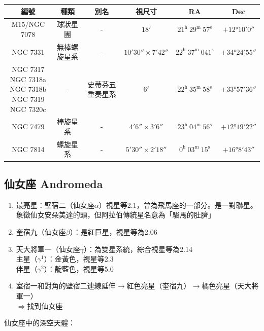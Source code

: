 \begin{center}
\begin{longtable}{c | c | c | c | c | c}
    編號 & 種類 & 別名 & 視尺寸 & RA & Dec \\
    \hline
    \endfirsthead


    \endfoot

    \endlastfoot

    M15/NGC 7078 & 球狀星團 & - & \(\ang{;18;}\) & \(21^\text{h }29^\text{m }57^\text{s}\) & \(+\ang{12;10;0}\) \\ %
    NGC 7331 & 無棒螺旋星系 & - & \(\ang{;10;30}\times\ang{;7;42}\) & \(22^\text{h }37^\text{m }041^\text{s}\) & \(+\ang{34;24;55}\) \\ %
    \makecell{NGC 7317\\NGC 7318a\\NGC 7318b\\NGC 7319\\NGC 7320c} & - & 史蒂芬五重奏星系 & \(\ang{;6;}\) & \(22^\text{h }35^\text{m }58^\text{s}\) & \(+\ang{33;57;36}\) \\ %
    NGC 7479 & 棒旋星系 & - & \(\ang{;4;6}\times\ang{;3;6}\) & \(23^\text{h }04^\text{m }56^\text{s}\) & \(+\ang{12;19;22}\) \\ %
    NGC 7814 & 螺旋星系 & - & \(\ang{;5;30}\times\ang{;2;18}\) & \(0^\text{h }03^\text{m }15^\text{s}\) & \(+\ang{16;8;43}\) \\ %
\end{longtable}
\end{center}

\subsection{仙女座 Andromeda}
\begin{enumerate}
    \item 最亮星：壁宿二（仙女座\(\alpha\)）視星等2.1，曾為飛馬座的一部分。是一對聯星。象徵仙女安朵美達的頭，但阿拉伯傳統星名意為「駿馬的肚臍」
    \item 奎宿九（仙女座\(\beta\)）：是紅巨星，視星等為2.06
    \item 天大將軍一（仙女座\(\gamma\)）：為雙星系統，綜合視星等為2.14\\主星（\(\gamma^1\)）：金黃色，視星等2.3\\伴星（\(\gamma^2\)）：靛藍色，視星等5.0
    \item 室宿一和對角的壁宿二連線延伸\(\rightarrow\)紅色亮星（奎宿九）\(\rightarrow\)橘色亮星（天大將軍一）\\\(\Rightarrow\)找到仙女座
\end{enumerate}
仙女座中的深空天體：
\newline

